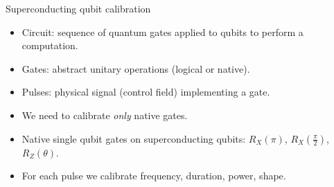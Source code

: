 \documentclass[aspectratio=169,10pt]{beamer}
\begin{document}
\begin{frame}{Superconducting qubit calibration}
  \begin{itemize}
    \item<1-> Circuit: sequence of quantum gates applied to qubits to perform a computation.
    \item<2-> Gates: abstract unitary operations (logical or native).
    \item<3-> Pulses: physical signal (control field) implementing a gate.
  \end{itemize}
\vspace{0.75em}
  \vspace{0.75em}
  \begin{itemize}
    \item<2-> We need to calibrate \textit{only} native gates.
    \item<2-> Native single qubit gates on superconducting qubits: $R_X(\pi)$, $R_X(\frac{\pi}{2})$, $R_Z(\theta)$.
    \item<3-> For each pulse we calibrate frequency, duration, power, shape.
  \end{itemize}
\end{frame}
\end{document}
